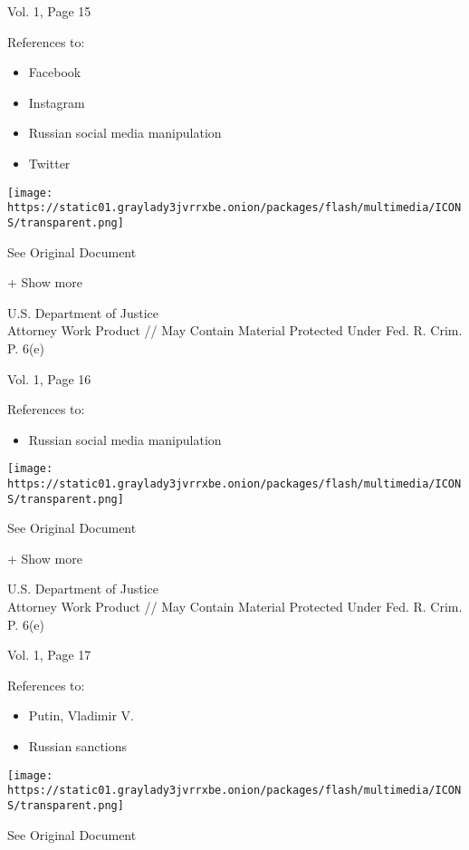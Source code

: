 Vol. 1, Page 15

References to:

\begin{itemize}
\tightlist
\item
  Facebook
\item
  Instagram
\item
  Russian social media manipulation
\item
  Twitter
\end{itemize}

\protect\hyperlink{}{}

\texttt{[image: https://static01.graylady3jvrrxbe.onion/packages/flash/multimedia/ICONS/transparent.png]}

See Original Document

+ Show more

U.S. Department of Justice\\
Attorney Work Product // May Contain Material Protected Under Fed. R.
Crim. P. 6(e)

Vol. 1, Page 16

References to:

\begin{itemize}
\tightlist
\item
  Russian social media manipulation
\end{itemize}

\protect\hyperlink{}{}

\texttt{[image: https://static01.graylady3jvrrxbe.onion/packages/flash/multimedia/ICONS/transparent.png]}

See Original Document

+ Show more

U.S. Department of Justice\\
Attorney Work Product // May Contain Material Protected Under Fed. R.
Crim. P. 6(e)

Vol. 1, Page 17

References to:

\begin{itemize}
\tightlist
\item
  Putin, Vladimir V.
\item
  Russian sanctions
\end{itemize}

\protect\hyperlink{}{}

\texttt{[image: https://static01.graylady3jvrrxbe.onion/packages/flash/multimedia/ICONS/transparent.png]}

See Original Document


